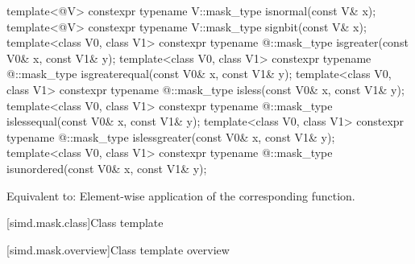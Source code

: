 \begin{itemdecl}
template<@\mathfloatingpoint@ V> constexpr typename V::mask_type isnormal(const V& x);
template<@\mathfloatingpoint@ V> constexpr typename V::mask_type signbit(const V& x);
template<class V0, class V1>
  constexpr typename @::mask_type isgreater(const V0& x, const V1& y);
template<class V0, class V1>
  constexpr typename @::mask_type isgreaterequal(const V0& x, const V1& y);
template<class V0, class V1>
  constexpr typename @::mask_type isless(const V0& x, const V1& y);
template<class V0, class V1>
  constexpr typename @::mask_type islessequal(const V0& x, const V1& y);
template<class V0, class V1>
  constexpr typename @::mask_type islessgreater(const V0& x, const V1& y);
template<class V0, class V1>
  constexpr typename @::mask_type isunordered(const V0& x, const V1& y);
\end{itemdecl}
\begin{itemdescr}
  \pnum\effects
  Equivalent to: Element-wise application of the corresponding function.
\end{itemdescr}

[simd.mask.class]{Class template }

[simd.mask.overview]{Class template  overview}

